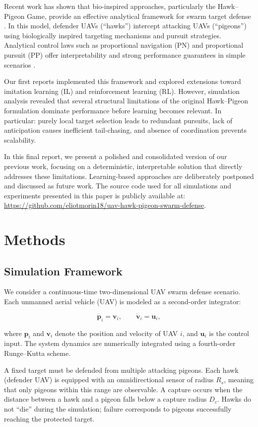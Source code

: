 \documentclass[a4paper,11pt,twocolumn]{article}
\begin{document}
Recent work has shown that bio-inspired approaches, particularly the Hawk–Pigeon Game, provide an effective analytical framework for swarm target defense \cite{ruan2021hawk}. In this model, defender UAVs (“hawks”) intercept attacking UAVs (“pigeons”) using biologically inspired targeting mechanisms and pursuit strategies. Analytical control laws such as proportional navigation (PN) and proportional pursuit (PP) offer interpretability and strong performance guarantees in simple scenarios \cite{zarchan2012missile}.

Our first reports implemented this framework and explored extensions toward imitation learning (IL) and reinforcement learning (RL). However, simulation analysis revealed that several structural limitations of the original Hawk–Pigeon formulation dominate performance before learning becomes relevant. In particular: purely local target selection leads to redundant pursuits, lack of anticipation causes inefficient tail-chasing, and absence of coordination prevents scalability.

In this final report, we present a polished and consolidated version of our previous work, focusing on a deterministic, interpretable solution that directly addresses these limitations. Learning-based approaches are deliberately postponed and discussed as future work. The source code used for all simulations and experiments presented in this paper
is publicly available at:
\url{https://github.com/eliotmorin18/uav-hawk-pigeon-swarm-defense}.

\section{Methods}

\subsection{Simulation Framework}

We consider a continuous-time two-dimensional UAV swarm defense scenario. Each unmanned aerial vehicle (UAV) is modeled as a second-order integrator:

\[
\dot{\mathbf{p}}_i = \mathbf{v}_i, \qquad 
\dot{\mathbf{v}}_i = \mathbf{u}_i,
\]

where $\mathbf{p}_i$ and $\mathbf{v}_i$ denote the position and velocity of UAV $i$, and $\mathbf{u}_i$ is the control input. The system dynamics are numerically integrated using a fourth-order Runge--Kutta scheme.

A fixed target must be defended from multiple attacking pigeons. Each hawk (defender UAV) is equipped with an omnidirectional sensor of radius $R_s$, meaning that only pigeons within this range are observable. A capture occurs when the distance between a hawk and a pigeon falls below a capture radius $D_c$. Hawks do not ``die'' during the simulation; failure corresponds to pigeons successfully reaching the protected target.
\end{document}
